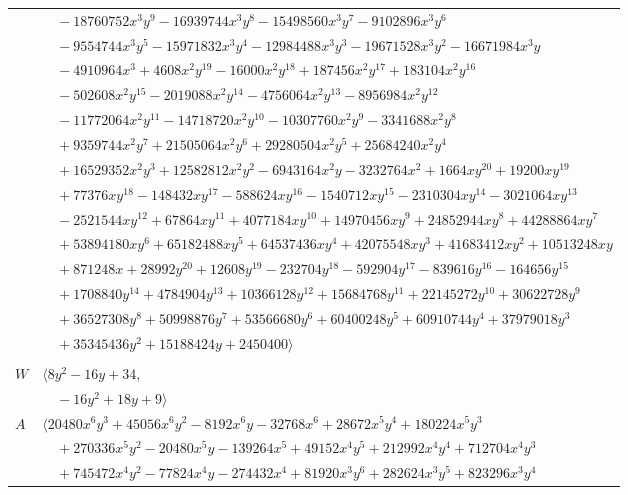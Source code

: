\documentclass[11pt]{article}
\begin{document}
\begin{longtable}{@{}ll@{}}
 & $\quad -18760752x^{3}y^{9}-16939744x^{3}y^{8}-15498560x^{3}y^{7}-9102896x^{3}y^{6}$\\
 & $\quad -9554744x^{3}y^{5}-15971832x^{3}y^{4}-12984488x^{3}y^{3}-19671528x^{3}y^{2}-16671984x^{3}y$\\
 & $\quad -4910964x^{3}+4608x^{2}y^{19}-16000x^{2}y^{18}+187456x^{2}y^{17}+183104x^{2}y^{16}$\\
 & $\quad -502608x^{2}y^{15}-2019088x^{2}y^{14}-4756064x^{2}y^{13}-8956984x^{2}y^{12}$\\
 & $\quad -11772064x^{2}y^{11}-14718720x^{2}y^{10}-10307760x^{2}y^{9}-3341688x^{2}y^{8}$\\
 & $\quad +9359744x^{2}y^{7}+21505064x^{2}y^{6}+29280504x^{2}y^{5}+25684240x^{2}y^{4}$\\
 & $\quad +16529352x^{2}y^{3}+12582812x^{2}y^{2}-6943164x^{2}y-3232764x^{2}+1664xy^{20}+19200xy^{19}$\\
 & $\quad +77376xy^{18}-148432xy^{17}-588624xy^{16}-1540712xy^{15}-2310304xy^{14}-3021064xy^{13}$\\
 & $\quad -2521544xy^{12}+67864xy^{11}+4077184xy^{10}+14970456xy^{9}+24852944xy^{8}+44288864xy^{7}$\\
 & $\quad +53894180xy^{6}+65182488xy^{5}+64537436xy^{4}+42075548xy^{3}+41683412xy^{2}+10513248xy$\\
 & $\quad +871248x+28992y^{20}+12608y^{19}-232704y^{18}-592904y^{17}-839616y^{16}-164656y^{15}$\\
 & $\quad +1708840y^{14}+4784904y^{13}+10366128y^{12}+15684768y^{11}+22145272y^{10}+30622728y^{9}$\\
 & $\quad +36527308y^{8}+50998876y^{7}+53566680y^{6}+60400248y^{5}+60910744y^{4}+37979018y^{3}$\\
 & $\quad +35345436y^{2}+15188424y+2450400\rangle$\\
\addlinespace[2pt]
\multicolumn{2}{@{}p{0.97\textwidth}@{}}{$i=15$, $D_i=16$, $\rho_{ij}$: $2{:}2, \allowbreak 3{:}1, \allowbreak 20{:}2, \allowbreak 21{:}1, \allowbreak 33{:}1, \allowbreak 35{:}1, \allowbreak 36{:}1, \allowbreak 58{:}2$}\\
$W$ & $\langle 8y^{2}-16y+34,$\\
 & $\quad -16y^{2}+18y+9\rangle$\\
$A$ & $\langle 20480x^{6}y^{3}+45056x^{6}y^{2}-8192x^{6}y-32768x^{6}+28672x^{5}y^{4}+180224x^{5}y^{3}$\\
 & $\quad +270336x^{5}y^{2}-20480x^{5}y-139264x^{5}+49152x^{4}y^{5}+212992x^{4}y^{4}+712704x^{4}y^{3}$\\
 & $\quad +745472x^{4}y^{2}-77824x^{4}y-274432x^{4}+81920x^{3}y^{6}+282624x^{3}y^{5}+823296x^{3}y^{4}$\\

\end{longtable}
\end{document}
